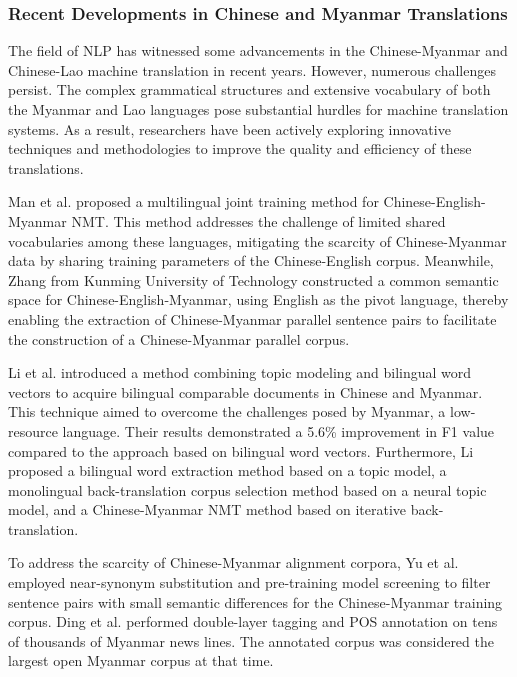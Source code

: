 \documentclass[acmsmall]{acmart}
\begin{document}
\subsubsection{Recent Developments in Chinese and Myanmar Translations}

The field of NLP has witnessed some advancements in the Chinese-Myanmar and Chinese-Lao machine translation in recent years. However, numerous challenges persist. The complex grammatical structures and extensive vocabulary of both the Myanmar and Lao languages pose substantial hurdles for machine translation systems. As a result, researchers have been actively exploring innovative techniques and methodologies to improve the quality and efficiency of these translations.

Man et al. \cite{4-2-19} proposed a multilingual joint training method for Chinese-English-Myanmar NMT. This method addresses the challenge of limited shared vocabularies among these languages, mitigating the scarcity of Chinese-Myanmar data by sharing training parameters of the Chinese-English corpus. Meanwhile, Zhang\cite{4-2-20} from Kunming University of Technology constructed a common semantic space for Chinese-English-Myanmar, using English as the pivot language, thereby enabling the extraction of Chinese-Myanmar parallel sentence pairs to facilitate the construction of a Chinese-Myanmar parallel corpus.

Li et al. \cite{4-2-21} introduced a method combining topic modeling and bilingual word vectors to acquire bilingual comparable documents in Chinese and Myanmar. This technique aimed to overcome the challenges posed by Myanmar, a low-resource language. Their results demonstrated a 5.6\% improvement in F1 value compared to the approach based on bilingual word vectors. Furthermore, Li \cite{4-2-22} proposed a bilingual word extraction method based on a topic model, a monolingual back-translation corpus selection method based on a neural topic model, and a Chinese-Myanmar NMT method based on iterative back-translation.

To address the scarcity of Chinese-Myanmar alignment corpora, Yu et al. \cite{4-2-23} employed near-synonym substitution and pre-training model screening to filter sentence pairs with small semantic differences for the Chinese-Myanmar training corpus. Ding et al. \cite{corpus} performed double-layer tagging and POS annotation on tens of thousands of Myanmar news lines. The annotated corpus was considered the largest open Myanmar corpus at that time.
\end{document}
